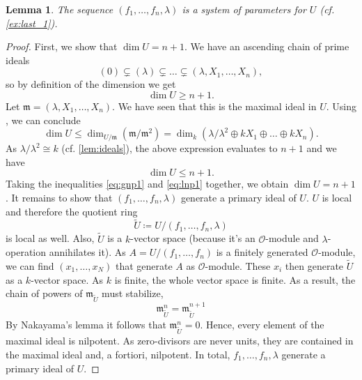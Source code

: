 \documentclass{article}
\theoremstyle{plain}%
\newtheorem{lemma}[theorem]{Lemma}
\theoremstyle{definition}
\theoremstyle{remark}
\begin{document}
\begin{lemma}\label{lem:sys_params}\textup{\cite[lemma 5.10]{Darmon1995}}
    The sequence \((f_1, \dots, f_n, \lambda)\) is a system of parameters for \(U\) (cf. \cref{ex:last_1}).
\end{lemma}
\begin{proof}
    First, we show that \(\dim U = n + 1\).
    We have an ascending chain of prime ideals
    \[
        (0) \subsetneq (\lambda) \subsetneq \dots \subsetneq (\lambda, X_1, \dots, X_n),  
    \]
    so by definition of the dimension we get 
    \begin{equation}
        \dim U \geq n + 1.\label{eq:gnp1}
    \end{equation}
    Let \(\mathfrak{m} = (\lambda, X_1, \dots, X_n)\). We have seen that this is the maximal ideal in \(U\).
    Using \cite[corollary 11.15]{Atiyah1969}, we can conclude 
    \[
        \dim U \leq \dim_{U/\mathfrak{m}}(\mathfrak{m}/\mathfrak{m}^2) 
        = \dim_k(\lambda/\lambda^2 \oplus k X_1 \oplus \dots \oplus k X_n).
    \]
    As \(\lambda/\lambda^2 \cong k\) (cf. \cref{lem:ideals}), the above expression evaluates to \(n+1\) and we have
    \begin{equation}
        \dim U \leq n + 1.\label{eq:lnp1}
    \end{equation}
    Taking the inequalities \ref{eq:gnp1} and \ref{eq:lnp1} together, we obtain \(\dim U = n + 1\).
    It remains to show that \((f_1, \dots, f_n, \lambda)\) generate a primary ideal of \(U\).
    \(U\) is local and therefore the quotient ring 
    \[\tilde{U} \coloneqq U/(f_1, \dots, f_n, \lambda)\] 
    is local as well.
    Also, \(\tilde U\) is a \(k\)-vector space (because it's an \(\mathcal{O}\)-module and \(\lambda\)-operation
    annihilates it). As \(A = U/(f_1, \dots, f_n)\) is a finitely generated \(\mathcal{O}\)-module, we can find
    \((x_1, \dots, x_N)\) that generate \(A\) as \(\mathcal{O}\)-module.
    These \(x_i\) then generate \(\tilde U\) as a \(k\)-vector space.
    As \(k\) is finite, the whole vector space is finite.
    As a result, the chain of powers of \(\mathfrak{m}_{\tilde U}\) must stabilize,
    \[
        \mathfrak{m}_{\tilde U}^n = \mathfrak{m}_{\tilde U}^{n+1}
    \]
    By Nakayama's lemma it follows that \(\mathfrak{m}_{\tilde U}^n = 0\).
    Hence, every element of the maximal ideal is nilpotent.
    As zero-divisors are never units, they are contained in the maximal ideal and, a fortiori, nilpotent.
    In total, \(f_1, \dots, f_n, \lambda\) generate a primary ideal of \(U\).
\end{proof}
\end{document}
